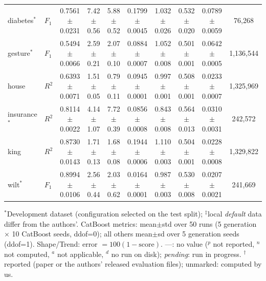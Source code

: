 \begin{table}[t]
{\begin{tabular}{llcccccccc}
diabetes$^{*}$ & $F_1$ & 0.7561{\scriptsize$\pm$0.0231} & 7.42{\scriptsize$\pm$0.56} & 5.88{\scriptsize$\pm$0.52} & 0.1799{\scriptsize$\pm$0.0045} & 1.032{\scriptsize$\pm$0.026} & 0.532{\scriptsize$\pm$0.020} & 0.0789{\scriptsize$\pm$0.0059} & 76{,}268 \\
gesture$^{*}$ & $F_1$ & 0.5494{\scriptsize$\pm$0.0066} & 2.59{\scriptsize$\pm$0.21} & 2.07{\scriptsize$\pm$0.10} & 0.0884{\scriptsize$\pm$0.0007} & 1.052{\scriptsize$\pm$0.008} & 0.501{\scriptsize$\pm$0.001} & 0.0642{\scriptsize$\pm$0.0005} & 1{,}136{,}544 \\
house & $R^2$ & 0.6393{\scriptsize$\pm$0.0071} & 1.51{\scriptsize$\pm$0.05} & 0.79{\scriptsize$\pm$0.11} & 0.0945{\scriptsize$\pm$0.0001} & 0.997{\scriptsize$\pm$0.001} & 0.508{\scriptsize$\pm$0.001} & 0.0233{\scriptsize$\pm$0.0007} & 1{,}325{,}969 \\
insurance$^{*}$ & $R^2$ & 0.8114{\scriptsize$\pm$0.0022} & 4.14{\scriptsize$\pm$1.07} & 7.72{\scriptsize$\pm$0.39} & 0.0856{\scriptsize$\pm$0.0008} & 0.843{\scriptsize$\pm$0.008} & 0.564{\scriptsize$\pm$0.013} & 0.0310{\scriptsize$\pm$0.0031} & 242{,}572 \\
king & $R^2$ & 0.8730{\scriptsize$\pm$0.0143} & 1.71{\scriptsize$\pm$0.13} & 1.68{\scriptsize$\pm$0.08} & 0.1944{\scriptsize$\pm$0.0006} & 1.110{\scriptsize$\pm$0.003} & 0.504{\scriptsize$\pm$0.001} & 0.0228{\scriptsize$\pm$0.0008} & 1{,}329{,}822 \\
wilt$^{*}$ & $F_1$ & 0.8994{\scriptsize$\pm$0.0106} & 2.56{\scriptsize$\pm$0.44} & 2.03{\scriptsize$\pm$0.62} & 0.0164{\scriptsize$\pm$0.0001} & 0.987{\scriptsize$\pm$0.003} & 0.530{\scriptsize$\pm$0.008} & 0.0207{\scriptsize$\pm$0.0021} & 241{,}669 \\
\bottomrule
\end{tabular}}
\par\smallskip\footnotesize $^{*}$Development dataset (configuration selected on the test split); $^\ddagger$local \textit{default} data differ from the authors'. CatBoost metrics: mean$\pm$std over 50 runs (5 generation $\times$ 10 CatBoost seeds, ddof=0); all others mean$\pm$sd over 5 generation seeds (ddof=1). Shape/Trend: error $=100(1-\mathrm{score})$. ---: no value ($^{p}$ not reported, $^{n}$ not computed, $^{a}$ not applicable, $^{d}$ no run on disk); \emph{pending}: run in progress. $^\dagger$reported (paper or the authors' released evaluation files); unmarked: computed by us.
\end{table}
